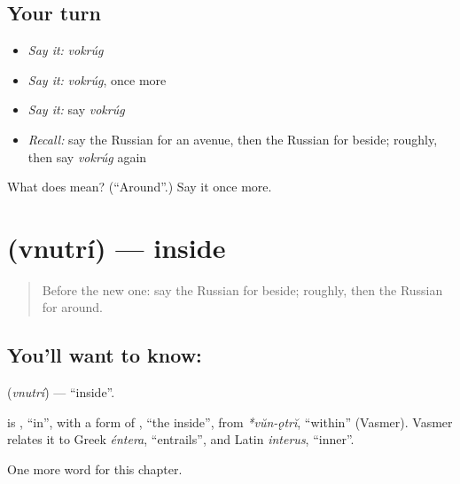 \subsection*{Your turn}
\begin{itemize}
\raggedright
  \item \emph{Say it:} \emph{vokrúg}
  \item \emph{Say it:} \emph{vokrúg}, once more
  \item \emph{Say it:} say \emph{vokrúg}
  \item \emph{Recall:} say the Russian for an avenue, then the Russian for beside; roughly, then say \emph{vokrúg} again
\end{itemize}

\begin{tcolorbox}[breakable,colback=teal!4,colframe=teal!35!black,title={Before you move on}]
What does  mean? (\textquotedblleft{}Around\textquotedblright{}.) Say it once more.
\end{tcolorbox}
\section[\texorpdfstring{\ru{внутри} (vnutrí)}{внутри (vnutrí)}]{ (vnutrí) — inside}

\label{lesson:RU-C152-vnutri}



\begin{quote}
Before the new one: say the Russian for beside; roughly, then the Russian for around.
\end{quote}

\subsection*{You'll want to know: }
\textbf{} (\emph{vnutrí}) — \textquotedblleft{}inside\textquotedblright{}.

\begin{cousinweb}
\textbf{} is \emph{}, \textquotedblleft{}in\textquotedblright{}, with a form of \emph{}, \textquotedblleft{}the inside\textquotedblright{}, from \emph{*vŭn-ǫtrĭ}, \textquotedblleft{}within\textquotedblright{} (Vasmer). Vasmer relates it to Greek \emph{éntera}, \textquotedblleft{}entrails\textquotedblright{}, and Latin \emph{interus}, \textquotedblleft{}inner\textquotedblright{}.
\end{cousinweb}

\begin{grammarlens}[title={What you've built}]
One more word for this chapter.
\end{grammarlens}

